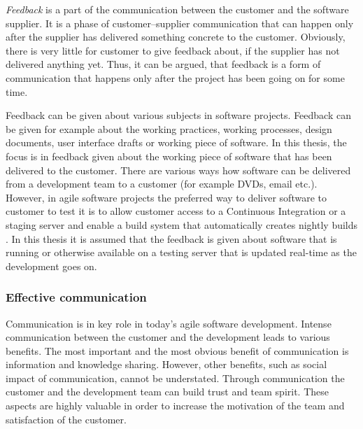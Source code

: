 \documentclass[english,12pt,a4paper,pdftex]{article}
\begin{document}
\textit{Feedback} is a part of the communication between the customer and the software supplier. It is a phase of customer--supplier communication that can happen only after the supplier has delivered something concrete to the customer. Obviously, there is very little for customer to give feedback about, if the supplier has not delivered anything yet. Thus, it can be argued, that feedback is a form of communication that happens only after the project has been going on for some time.

Feedback can be given about various subjects in software projects. Feedback can be given for example about the working practices, working processes, design documents, user interface drafts or working piece of software. In this thesis, the focus is in feedback given about the working piece of software that has been delivered to the customer. There are various ways how software can be delivered from a development team to a customer (for example DVDs, email etc.). However, in agile software projects the preferred way to deliver software to customer to test it is to allow customer access to a Continuous Integration or a staging server and enable a build system that automatically creates nightly builds \citep{shore2007} \citep{beck2004}. In this thesis it is assumed that the feedback is given about software that is running or otherwise available on a testing server that is updated real-time as the development goes on.

\subsubsection{Effective communication}

Communication is in key role in today's agile software development. Intense communication between the customer and the development leads to various benefits. The most important and the most obvious benefit of communication is information and knowledge sharing. However, other benefits, such as social impact of communication, cannot be understated. Through communication the customer and the development team can build trust and team spirit. These aspects are highly valuable in order to increase the motivation of the team and satisfaction of the customer.
\end{document}
